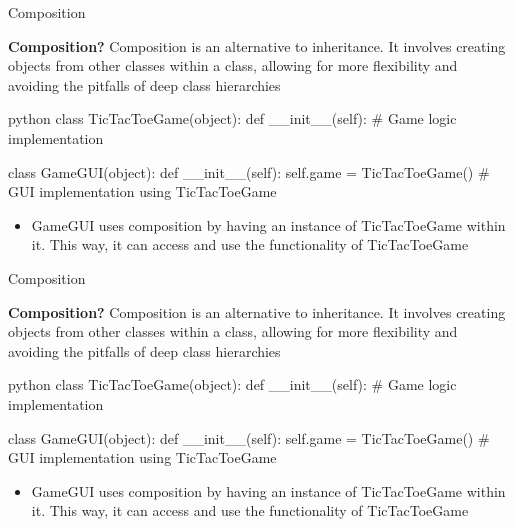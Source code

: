 \documentclass[
	11pt, 
]{beamer}
\begin{document}
\begin{frame}[fragile]{Composition}
\begin{block}{\textbf{Composition?}}
Composition is an alternative to inheritance. It involves creating objects from other classes within a class, allowing for more flexibility and avoiding the pitfalls of deep class hierarchies
\end{block}


\begin{mintedbox}{python}
class TicTacToeGame(object):
    def __init__(self):
        # Game logic implementation

class GameGUI(object):
    def __init__(self):
        self.game = TicTacToeGame()
        # GUI implementation using TicTacToeGame
\end{mintedbox}

\begin{itemize}
    \item  GameGUI uses composition by having an instance of TicTacToeGame within it. This way, it can access and use the functionality of TicTacToeGame 
\end{itemize}

\end{frame}



\begin{frame}[fragile]{Composition}
\begin{block}{\textbf{Composition?}}
Composition is an alternative to inheritance. It involves creating objects from other classes within a class, allowing for more flexibility and avoiding the pitfalls of deep class hierarchies
\end{block}


\begin{mintedbox}{python}
class TicTacToeGame(object):
    def __init__(self):
        # Game logic implementation

class GameGUI(object):
    def __init__(self):
        self.game = TicTacToeGame()
        # GUI implementation using TicTacToeGame
\end{mintedbox}

\begin{itemize}
    \item  GameGUI uses composition by having an instance of TicTacToeGame within it. This way, it can access and use the functionality of TicTacToeGame 
\end{itemize}

\end{frame}
\end{document}
